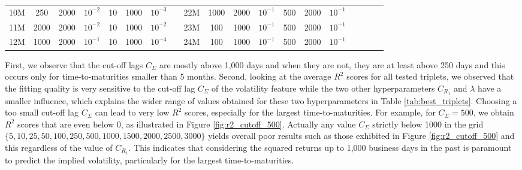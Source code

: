 \begin{table}[h]
{\begin{tabular}{@{}cccccccccccccccllll@{}}
    \multicolumn{1}{c|}{10M} & 250         & 2000         & \multicolumn{1}{c|}{$10^{-2}$} & 10           & 1000           & $10^{-3}$   &                      & \multicolumn{1}{c|}{22M} & 1000        & 2000         & \multicolumn{1}{c|}{$10^{-1}$} & 500          & 2000           & $10^{-1}$   &                               &                               &                      &                      \\
    \multicolumn{1}{c|}{11M} & 2000         & 2000         & \multicolumn{1}{c|}{$10^{-2}$} & 10           & 1000           & $10^{-2}$   &                      & \multicolumn{1}{c|}{23M} & 100        & 1000         & \multicolumn{1}{c|}{$10^{-1}$} & 500           &2000          & $10^{-1}$   &                               &                               &                      &                      \\
    \multicolumn{1}{c|}{12M} & 1000         & 2000         & \multicolumn{1}{c|}{$10^{-1}$} & 10           & 1000           & $10^{-4}$   &                      & \multicolumn{1}{c|}{24M} & 100        & 1000         & \multicolumn{1}{c|}{$10^{-1}$} & 500          &2000           & $10^{-1}$   &                               &                               &                      &                      \\ \cmidrule(r){1-7} \cmidrule(lr){9-15}
    \end{tabular}%
    }
\end{table}
First, we observe that the cut-off lags $C_{\Sigma}$ are mostly above 1,000 days and when they are not, they are at least above 250 days and this occurs only for time-to-maturities smaller than 5 months. Second, looking at the average $R^2$ scores for all tested triplets, we observed that the fitting quality is very sensitive to the cut-off lag $C_{\Sigma}$ of the volatility feature while the two other hyperparameters $C_{R_1}$ and $\lambda$ have a smaller influence, which explains the wider range of values obtained for these two hyperparameters in Table \ref{tab:best_triplets}. Choosing a too small cut-off lag $C_{\Sigma}$ can lead to very low $R^2$ scores, especially for the largest time-to-maturities. For example, for $C_{\Sigma}=500$, we obtain $R^2$ scores that are even below 0, as illustrated in Figure \ref{fig:r2_cutoff_500}. Actually any value $C_{\Sigma}$ strictly below 1000 in the grid $\{5,10,25,50,100,250,500,1000,1500,2000,2500,3000\}$ yields overall poor results such as those exhibited in Figure \ref{fig:r2_cutoff_500} and this regardless of the value of $C_{R_1}$. This indicates that considering the squared returns up to 1,000 business days in the past is paramount to predict the implied volatility, particularly for the largest time-to-maturities.\\

